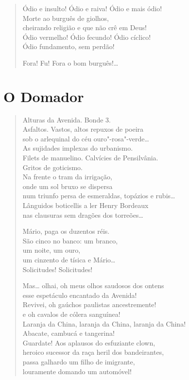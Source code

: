 \begin{verse}
Ódio e insulto! Ódio e raiva! Ódio e mais ódio!\\
Morte ao burguês de giolhos,\\
cheirando religião e que não crê em Deus!\\
Ódio vermelho! Ódio fecundo! Ódio cíclico!\\
Ódio fundamento, sem perdão!

Fora! Fu! Fora o bom burguês!\ldots{}
\end{verse}

\chapter{O Domador}

\begin{verse}
Alturas da Avenida. Bonde 3.\\
Asfaltos. Vastos, altos repuxos de poeira\\
sob o arlequinal do céu ouro"-rosa"-verde\ldots{}\\
As sujidades implexas do urbanismo.\\
Filets de manuelino. Calvícies de Pensilvânia.\\
Gritos de goticismo.\\
Na frente o tram da irrigação,\\
onde um sol bruxo se dispersa\\
num triunfo persa de esmeraldas, topázios e rubis\ldots{}\\
Lânguidos boticellis a ler Henry Bordeaux\\
nas clausuras sem dragões dos torreões\ldots{}

Mário, paga os duzentos réis.\\
São cinco no banco: um branco,\\
um noite, um ouro,\\
um cinzento de tísica e Mário\ldots{}\\
Solicitudes! Solicitudes!

Mas\ldots{} olhai, oh meus olhos saudosos dos ontens\\
esse espetáculo encantado da Avenida!\\
Revivei, oh gaúchos paulistas ancestremente!\\
e oh cavalos de cólera sanguínea!\\
Laranja da China, laranja da China, laranja da China!\\
Abacate, cambucá e tangerina!\\
Guardate! Aos aplausos do esfuziante clown,\\
heroico sucessor da raça heril dos bandeirantes,\\
passa galhardo um filho de imigrante,\\
louramente domando um automóvel!
\end{verse}

